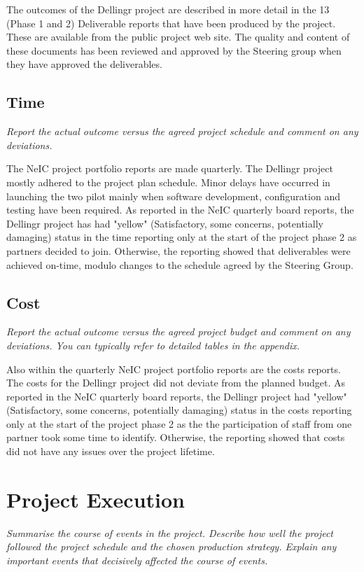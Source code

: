 \documentclass{article}
\newcommand{\dell}{Dellingr\xspace}
\begin{document}
The outcomes of the \dell project are described in more detail in the 13 (Phase 1 and 2) Deliverable reports
that have been produced by the project.
These are available from the public project web site.
The quality and content of these documents has been reviewed and approved by the Steering group when they have approved the deliverables.

\subsection{Time}
{\it Report the actual outcome versus the agreed project schedule and comment on any deviations.}

The NeIC project portfolio reports are made quarterly.
The \dell project mostly adhered to the project plan schedule.
Minor delays have occurred in launching the two pilot mainly when software development, configuration and testing  have been required.
As reported in the NeIC quarterly board reports, the \dell project has had "yellow" (Satisfactory, some concerns, potentially damaging)
status in the time reporting only at the start of the project phase 2 as partners decided to join.
Otherwise, the reporting showed that deliverables were achieved on-time, modulo changes to the schedule agreed by the Steering Group.

\subsection{Cost}
{\it Report the actual outcome versus the agreed project budget and comment on any deviations. You can typically refer to detailed tables in the appendix.}

Also within the quarterly NeIC project portfolio reports are the costs reports.
The costs for the \dell project did not deviate from the planned budget.
As reported in the NeIC quarterly board reports, the \dell project had "yellow" (Satisfactory, some concerns, potentially damaging)
status in the costs reporting only at the start of the project phase 2 as the the participation of staff from one partner
took some time to identify.
Otherwise, the reporting showed that costs did not have any issues over the project lifetime.

\section{Project Execution}
{\it Summarise the course of events in the project. Describe how well the project followed the project schedule and the chosen production strategy. Explain any important events that decisively affected the course of events.}
\end{document}
